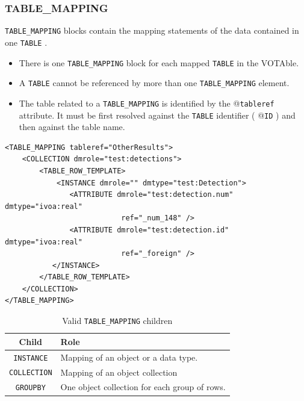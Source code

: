 \documentclass[11pt,a4paper]{ivoa}
\begin{document}
\FloatBarrier
%
%

\subsubsection{TABLE\_MAPPING}

\texttt{TABLE\_MAPPING} blocks contain the mapping statements of the data contained in one \texttt{TABLE} .

\begin{itemize}
    \item There is one \texttt{TABLE\_MAPPING} block for each mapped \texttt{TABLE}  in the VOTAble.    
    \item A \texttt{TABLE} cannot be referenced by more than one \texttt{TABLE\_MAPPING} element.
    \item The table related to a \texttt{TABLE\_MAPPING} is identified by the @\texttt{tableref} attribute. 
            It must be first resolved against the \texttt{TABLE} identifier ( @\texttt{ID} ) and then against the table name.
\end{itemize}

\begin{lstlisting}[caption={TABLE\_MAPPING block example},style=XML]
<TABLE_MAPPING tableref="OtherResults">
    <COLLECTION dmrole="test:detections">
        <TABLE_ROW_TEMPLATE>
            <INSTANCE dmrole="" dmtype="test:Detection">
               <ATTRIBUTE dmrole="test:detection.num" dmtype="ivoa:real"
                           ref="_num_148" />
               <ATTRIBUTE dmrole="test:detection.id" dmtype="ivoa:real"
                           ref="_foreign" />
           </INSTANCE>
        </TABLE_ROW_TEMPLATE>
    </COLLECTION>
</TABLE_MAPPING>
\end{lstlisting}


\begin{table}[!htbp]
\small
\centering
\begin{tabulary}{\linewidth}{|c|J|}       
       \hline 
           \textbf{Child} &  
           \textbf{Role}\\
       \hline         \hline  
           \texttt{INSTANCE}    & 
           Mapping of an object or a data type.  \\              
       \hline  
             \texttt{COLLECTION}    &  
             Mapping of an object collection \\       
        \hline  
            \texttt{GROUPBY}    &  
            One object collection for each group of rows. \\
      \hline 
     \end{tabulary}
     \caption{Valid \texttt{TABLE\_MAPPING} children} 
     \label{tbl:templ-children}
 \end{table}
\end{document}
